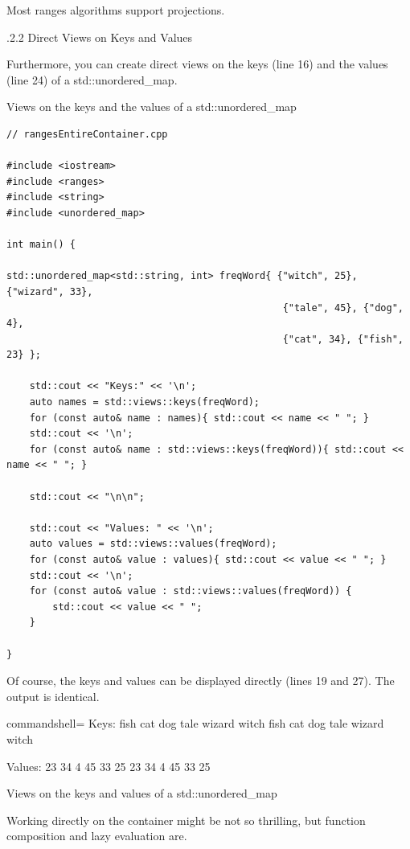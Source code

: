 Most ranges algorithms support projections.

.2.2\hspace{0.2cm} Direct Views on Keys and Values

Furthermore, you can create direct views on the keys (line 16) and the values (line 24) of a std::unordered\_map.

\noindent
Views on the keys and the values of a std::unordered\_map
\begin{lstlisting}[style=styleCXX]
// rangesEntireContainer.cpp

#include <iostream>
#include <ranges>
#include <string>
#include <unordered_map>

int main() {

std::unordered_map<std::string, int> freqWord{ {"witch", 25}, {"wizard", 33},
												{"tale", 45}, {"dog", 4},
												{"cat", 34}, {"fish", 23} };

	std::cout << "Keys:" << '\n';
	auto names = std::views::keys(freqWord);
	for (const auto& name : names){ std::cout << name << " "; }
	std::cout << '\n';
	for (const auto& name : std::views::keys(freqWord)){ std::cout << name << " "; }
	
	std::cout << "\n\n";

	std::cout << "Values: " << '\n';
	auto values = std::views::values(freqWord);
	for (const auto& value : values){ std::cout << value << " "; }
	std::cout << '\n';
	for (const auto& value : std::views::values(freqWord)) {
		std::cout << value << " ";
	}

}
\end{lstlisting}

Of course, the keys and values can be displayed directly (lines 19 and 27). The output is identical.

\begin{tcblisting}{commandshell={}}
Keys:
fish cat dog tale wizard witch
fish cat dog tale wizard witch

Values:
23 34 4 45 33 25
23 34 4 45 33 25
\end{tcblisting}

\begin{center}
Views on the keys and values of a std::unordered\_map
\end{center}

Working directly on the container might be not so thrilling, but function composition and lazy evaluation are.


